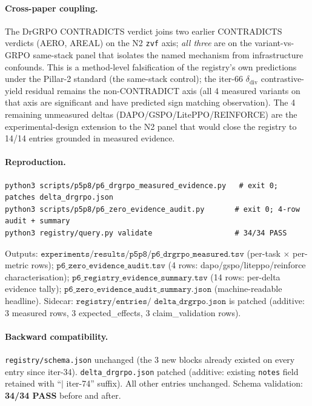 \paragraph{Cross-paper coupling.}
The DrGRPO CONTRADICTS verdict joins two earlier CONTRADICTS verdicts
(AERO, AREAL) on the N2 \texttt{zvf} axis; \emph{all three} are
on the variant-vs-GRPO same-stack panel that isolates the named
mechanism from infrastructure confounds. This is a method-level
falsification of the registry's own predictions under the
Pillar-2 standard (the same-stack control); the iter-66
$\delta_{\text{div}}$ contrastive-yield residual remains the
non-CONTRADICT axis (all 4 measured variants on that axis are
significant and have predicted sign matching observation).
The 4 remaining unmeasured deltas (DAPO/GSPO/LitePPO/REINFORCE)
are the experimental-design extension to the N2 panel that would
close the registry to 14/14 entries grounded in measured evidence.

\paragraph{Reproduction.}
\begin{verbatim}
python3 scripts/p5p8/p6_drgrpo_measured_evidence.py   # exit 0; patches delta_drgrpo.json
python3 scripts/p5p8/p6_zero_evidence_audit.py       # exit 0; 4-row audit + summary
python3 registry/query.py validate                   # 34/34 PASS
\end{verbatim}
Outputs: $\texttt{experiments/results/p5p8/p6\_drgrpo\_measured.tsv}$
(per-task $\times$ per-metric rows); $\texttt{p6\_zero\_evidence\_audit.tsv}$
(4 rows: dapo/gspo/liteppo/reinforce characterisation);
$\texttt{p6\_registry\_evidence\_summary.tsv}$ (14 rows: per-delta
evidence tally); $\texttt{p6\_zero\_evidence\_audit\_summary.json}$
(machine-readable headline). Sidecar: $\texttt{registry/entries/
delta\_drgrpo.json}$ is patched (additive: 3 measured rows, 3 expected\_effects,
3 claim\_validation rows).

\paragraph{Backward compatibility.}
\texttt{registry/schema.json} unchanged (the 3 new blocks already
existed on every entry since iter-34). \texttt{delta\_drgrpo.json}
patched (additive: existing \texttt{notes} field retained with
``$|$ iter-74'' suffix). All other entries unchanged. Schema
validation: \textbf{34/34 PASS} before and after.